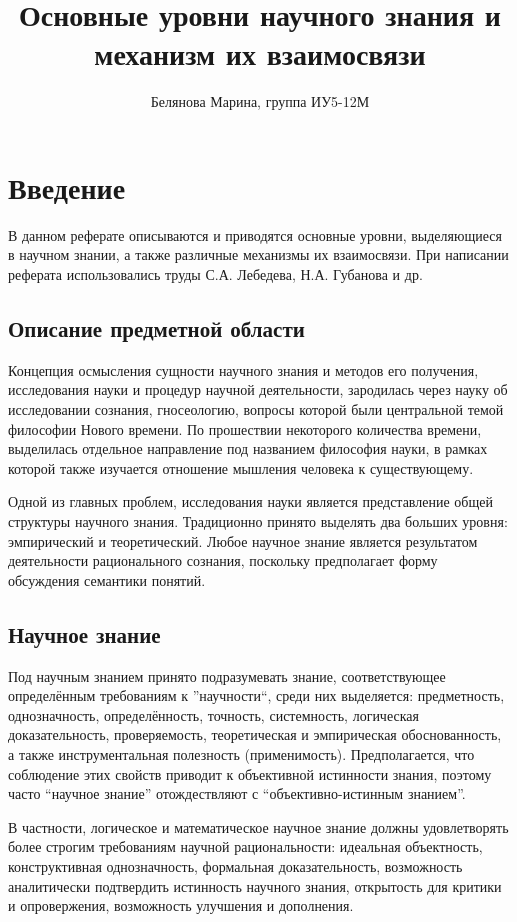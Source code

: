 \documentclass[14pt]{article}
\title{Основные уровни научного знания и механизм их взаимосвязи}
\author{Белянова Марина, группа ИУ5-12М}
\begin{document}
\maketitle
\tableofcontents

\section{Введение}

В данном реферате описываются и приводятся основные уровни, выделяющиеся в научном знании, а также различные механизмы их взаимосвязи. При написании реферата использовались труды С.А. Лебедева, Н.А. Губанова и др.
\subsection{Описание предметной области}
Концепция осмысления сущности научного знания и методов его получения, исследования науки и процедур научной деятельности, зародилась через науку об исследовании сознания, гносеологию, вопросы которой были центральной темой философии Нового времени. По прошествии некоторого количества времени, выделилась отдельное направление под названием философия науки, в рамках которой также изучается отношение мышления человека к существующему.


Одной из главных проблем, исследования науки является представление общей структуры научного знания. Традиционно принято выделять два больших уровня: эмпирический и теоретический. Любое научное знание является результатом деятельности рационального сознания, поскольку предполагает форму обсуждения семантики понятий.

\subsection{Научное знание}

Под научным знанием принято подразумевать знание, соответствующее определённым требованиям к ''научности``, среди них выделяется: предметность, однозначность, определённость, точность, системность, логическая доказательность, проверяемость, теоретическая и эмпирическая обоснованность, а также инструментальная полезность (применимость). Предполагается, что соблюдение этих свойств приводит к объективной истинности знания, поэтому часто ``научное знание'' отождествляют с ``объективно-истинным знанием''.

В частности, логическое и математическое научное знание должны удовлетворять более строгим требованиям научной рациональности: идеальная объектность, конструктивная однозначность, формальная доказательность, возможность аналитически подтвердить истинность научного знания, открытость для критики и опровержения, возможность улучшения и дополнения.
\end{document}
